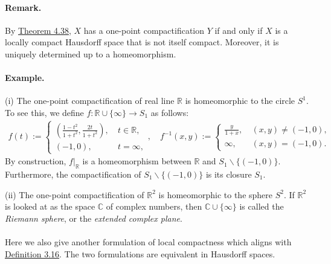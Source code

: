 \documentclass{article}
\numberwithin{equation}{section}
\theoremstyle{plain}
\theoremstyle{definition}
\begin{document}
\paragraph{Remark.} By \hyperref[thm:4.38]{Theorem 4.38}, $X$ has a one-point compactification $Y$ if and only if $X$ is a locally compact Hausdorff space that is not itself compact. Moreover, it is uniquely determined up to a homeomorphism.

\paragraph{Example.} (i) The one-point compactification of real line $\mathbb{R}$ is homeomorphic to the circle $S^1$. To see this, we define $f:\mathbb{R}\cup\{\infty\}\to S_1$ as follows:
\begin{align*}
	f(t):=\begin{cases}
		\left(\frac{1-t^2}{1+t^2},\frac{2t}{1+t^2}\right),\ & t\in\mathbb{R},\\
		(-1,0),\ & t=\infty,
	\end{cases},\quad
    f^{-1}(x,y):=\begin{cases}
    	\frac{y}{1+x},\ &(x,y)\neq(-1,0),\\
    	\infty,\ &(x,y)=(-1,0).
    \end{cases}
\end{align*}
By construction, $f|_\mathbb{R}$ is a homeomorphism between $\mathbb{R}$ and $S_1\backslash\{(-1,0)\}$. Furthermore, the compactification of $S_1\backslash\{(-1,0)\}$ is its closure $S_1$.

(ii) The one-point compactification of $\mathbb{R}^2$ is homeomorphic to the sphere $S^2$. If $\mathbb{R}^2$ is looked at as the space $\mathbb{C}$ of complex numbers, then $\mathbb{C}\cup\{\infty\}$ is called the \textit{Riemann sphere}, or the \textit{extended complex plane}.

\paragraph{} Here we also give another formulation of local compactness which aligns with \hyperref[def:3.16]{Definition 3.16}. The two formulations are equivalent in Hausdorff spaces.
\end{document}
